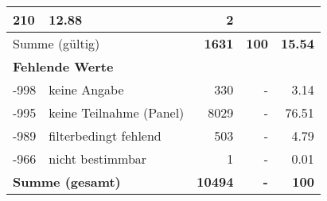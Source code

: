 \begin{longtable}{lXrrr}
       \num{210} &
       \num[round-mode=places,round-precision=2]{12,88} &
         \num[round-mode=places,round-precision=2]{2} \\
     \midrule
     \multicolumn{2}{l}{Summe (gültig)} &
       \textbf{\num{1631}} &
     \textbf{100} &
       \textbf{\num[round-mode=places,round-precision=2]{15,54}} \\
     \multicolumn{5}{l}{\textbf{Fehlende Werte}}\\
       -998 &
       keine Angabe &
         \num{330} &
        - &
         \num[round-mode=places,round-precision=2]{3,14} \\
       -995 &
       keine Teilnahme (Panel) &
         \num{8029} &
        - &
         \num[round-mode=places,round-precision=2]{76,51} \\
       -989 &
       filterbedingt fehlend &
         \num{503} &
        - &
         \num[round-mode=places,round-precision=2]{4,79} \\
       -966 &
       nicht bestimmbar &
         \num{1} &
        - &
         \num[round-mode=places,round-precision=2]{0,01} \\
     \midrule
     \multicolumn{2}{l}{\textbf{Summe (gesamt)}} &
          \textbf{\num{10494}} &
        \textbf{-} &
        \textbf{100} \\
     \bottomrule
     \end{longtable}
     
